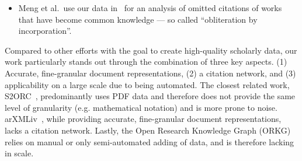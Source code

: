 \begin{itemize}
\begin{itemize}
        \item Meng et al.\ use our data in~\cite{Meng2023} for an analysis of omitted citations of works that have become common knowledge --- so called ``obliteration by incorporation''.
    \end{itemize}
\end{itemize}

Compared to other efforts with the goal to create high-quality scholarly data, our work particularly stands out through the combination of three key aspects. (1) Accurate, fine-granular document representations, (2) a citation network, and (3) applicability on a large scale due to being automated. The closest related work, S2ORC~\cite{Lo2020}, predominantly uses PDF data and therefore does not provide the same level of granularity (e.g. mathematical notation) and is more prone to noise. arXMLiv~\cite{arXMLiv}, while providing accurate, fine-granular document representations, lacks a citation network. Lastly, the Open Research Knowledge Graph (ORKG)~\cite{orkg1,orkg2} relies on manual or only semi-automated adding of data, and is therefore lacking in scale.




